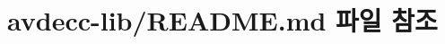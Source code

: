 \hypertarget{avdecc-lib_2_r_e_a_d_m_e_8md}{}\section{avdecc-\/lib/\+R\+E\+A\+D\+ME.md 파일 참조}
\label{avdecc-lib_2_r_e_a_d_m_e_8md}
